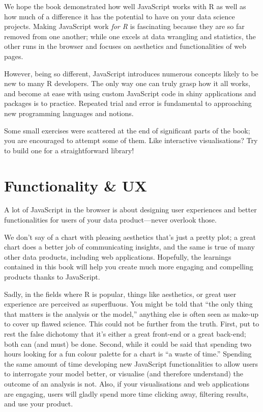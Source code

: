 \documentclass[
]{krantz}
\begin{document}
We hope the book demonstrated how well JavaScript works with R as well as how much of a difference it has the potential to have on your data science projects. Making JavaScript work \emph{for R} is fascinating because they are so far removed from one another; while one excels at data wrangling and statistics, the other runs in the browser and focuses on aesthetics and functionalities of web pages.

However, being so different, JavaScript introduces numerous concepts likely to be new to many R developers. The only way one can truly grasp how it all works, and become at ease with using custom JavaScript code in shiny applications and packages is to practice. Repeated trial and error is fundamental to approaching new programming languages and notions.

Some small exercises were scattered at the end of significant parts of the book; you are encouraged to attempt some of them. Like interactive visualisations? Try to build one for a straightforward library!

\hypertarget{conclusion-ux}{%
\section{Functionality \& UX}\label{conclusion-ux}}

A lot of JavaScript in the browser is about designing user experiences and better functionalities for users of your data product---never overlook those.

We don't say of a chart with pleasing aesthetics that's just a pretty plot; a great chart does a better job of communicating insights, and the same is true of many other data products, including web applications. Hopefully, the learnings contained in this book will help you create much more engaging and compelling products thanks to JavaScript.

Sadly, in the fields where R is popular, things like aesthetics, or great user experience are perceived as superfluous. You might be told that ``the only thing that matters is the analysis or the model,'' anything else is often seen as make-up to cover up flawed science. This could not be further from the truth. First, put to rest the false dichotomy that it's either a great front-end or a great back-end; both can (and must) be done. Second, while it could be said that spending two hours looking for a fun colour palette for a chart is ``a waste of time.'' Spending the same amount of time developing new JavaScript functionalities to allow users to interrogate your model better, or visualise (and therefore understand) the outcome of an analysis is not. Also, if your visualisations and web applications are engaging, users will gladly spend more time clicking away, filtering results, and use your product.

  

\backmatter
\printindex
\end{document}
